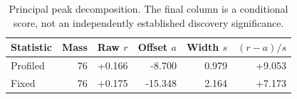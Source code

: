 \begin{table}[H]\centering\small
\begin{tabular}{lrrrrr}\toprule
Statistic & Mass & Raw $r$ & Offset $a$ & Width $s$ & $(r-a)/s$\\\midrule
Profiled & 76 & +0.166 & -8.700 & 0.979 & +9.053 \\
Fixed & 76 & +0.175 & -15.348 & 2.164 & +7.173 \\
\bottomrule\end{tabular}
\caption{Principal peak decomposition. The final column is a conditional score, not an independently established discovery significance.}\end{table}

